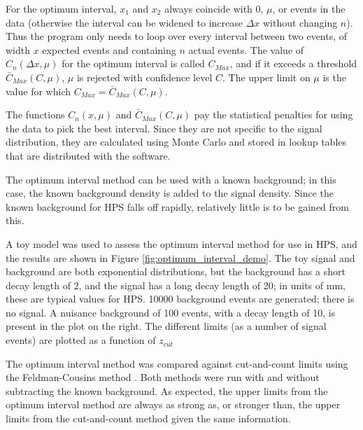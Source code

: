 For the optimum interval, $x_1$ and $x_2$ always coincide with 0, $\mu$, or events in the data (otherwise the interval can be widened to increase $\Delta x$ without changing $n$).
Thus the program only needs to loop over every interval between two events, of width $x$ expected events and containing $n$ actual events.
The value of $C_n(\Delta x,\mu)$ for the optimum interval is called $C_{Max}$, and if it exceeds a threshold $\bar{C}_{Max}(C,\mu)$, $\mu$ is rejected with confidence level $C$.
The upper limit on $\mu$ is the value for which $C_{Max}=\bar{C}_{Max}(C,\mu)$.


The functions $C_n(x,\mu)$ and $\bar{C}_{Max}(C,\mu)$ pay the statistical penalties for using the data to pick the best interval.
Since they are not specific to the signal distribution, they are calculated using Monte Carlo and stored in lookup tables that are distributed with the software.

The optimum interval method can be used with a known background; in this case, the known background density is added to the signal density.
Since the known background for HPS falls off rapidly, relatively little is to be gained from this.

A toy model was used to assess the optimum interval method for use in HPS, and the results are shown in Figure \ref{fig:optimum_interval_demo}.
The toy signal and background are both exponential distributions, but the background has a short decay length of 2, and the signal has a long decay length of 20; in units of mm, these are typical values for HPS.
10000 background events are generated; there is no signal.
A nuisance background of 100 events, with a decay length of 10, is present in the plot on the right.
The different limits (as a number of signal events) are plotted as a function of $z_{cut}$

The optimum interval method was compared against cut-and-count limits using the Feldman-Cousins method \cite{feldman_unified_1998}.
Both methods were run with and without subtracting the known background.
As expected, the upper limits from the optimum interval method are always as strong as, or stronger than, the upper limits from the cut-and-count method given the same information.

